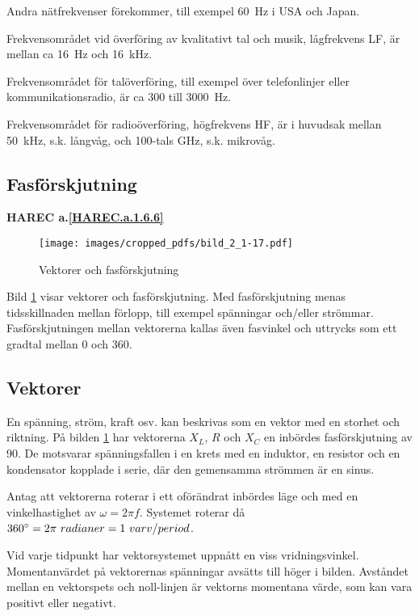 Andra nätfrekvenser förekommer, till exempel 60~Hz i USA och Japan.

Frekvensområdet vid överföring av kvalitativt tal och musik, lågfrekvens LF, är
mellan ca 16~Hz och 16~kHz.

Frekvensområdet för talöverföring, till exempel över telefonlinjer eller
kommunikationsradio, är ca 300 till 3000~Hz.

Frekvensområdet för radioöverföring, högfrekvens HF, är i huvudsak mellan
50~kHz, s.k. långvåg, och 100-tals GHz, s.k. mikrovåg.

\subsection{Fasförskjutning}
\textbf{HAREC a.\ref{HAREC.a.1.6.6}\label{myHAREC.a.1.6.6}}

\begin{figure}[ht]
\texttt{[image: images/cropped\_pdfs/bild\_2\_1-17.pdf]}
\caption{Vektorer och fasförskjutning}
\label{fig:BildII1-17}
\end{figure}

Bild \ref{fig:BildII1-17} visar vektorer och fasförskjutning.
Med fasförskjutning menas tidsskillnaden mellan förlopp, till exempel spänningar
och/eller strömmar.
Fasförskjutningen mellan vektorerna kallas även fasvinkel och uttrycks som ett
gradtal mellan 0 och 360\degree.

\subsection{Vektorer}

En spänning, ström, kraft osv. kan beskrivas som en vektor med en storhet och
riktning.
På bilden \ref{fig:BildII1-17} har vektorerna \(X_L\), \(R\) och \(X_C\) en
inbördes fasförskjutning av 90\degree.
De motsvarar spänningsfallen i en krets med en induktor, en resistor och en
kondensator kopplade i serie, där den gemensamma strömmen är en sinus.

Antag att vektorerna roterar i ett oförändrat inbördes läge och med en
vinkelhastighet av \(\omega= 2\pi f\).
Systemet roterar då \(360\degree = 2\pi\ radianer = 1\ varv/period\).

Vid varje tidpunkt har vektorsystemet uppnått en viss vridningsvinkel.
Momentanvärdet på vektorernas spänningar avsätts till höger i bilden.
Avståndet mellan en vektorspets och noll-linjen är vektorns momentana värde,
som kan vara positivt eller negativt.
